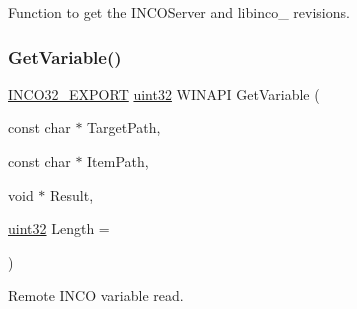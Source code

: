 Function to get the I\+N\+C\+O\+Server and libinco\+\_ revisions. 

\mbox{\label{group__commonfunctions_ga5a35fc7cdfb6037cb755ed8409a8f300}} 
\subsubsection{\texorpdfstring{Get\+Variable()}{GetVariable()}}
{\footnotesize\ttfamily \hyperlink{inco__32_8h_a09505cad5bbb66fc36750a4fbca0444b}{I\+N\+C\+O32\+\_\+\+E\+X\+P\+O\+RT} \hyperlink{indeltypes_8h_a4b435a49c74bb91f284f075e63416cb6}{uint32} W\+I\+N\+A\+PI Get\+Variable (\begin{DoxyParamCaption}\item[{const char $\ast$}]{Target\+Path,  }\item[{const char $\ast$}]{Item\+Path,  }\item[{void $\ast$}]{Result,  }\item[{\hyperlink{indeltypes_8h_a4b435a49c74bb91f284f075e63416cb6}{uint32}}]{Length = {} }\end{DoxyParamCaption})}



Remote I\+N\+CO variable read. 


